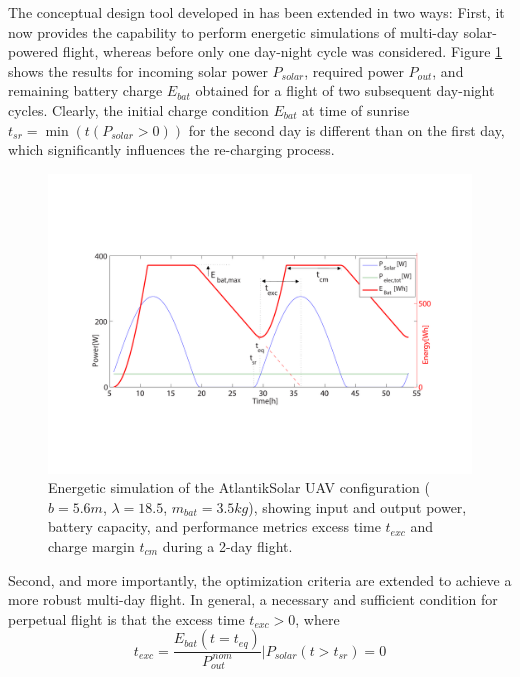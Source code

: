 \label{sec:ExtensionOptCriteria}
The conceptual design tool developed in \cite{Noth_PhD,Leutenegger_JIRS} has been extended in two ways: First, it now provides the capability to perform energetic simulations of multi-day solar-powered flight, whereas before only one day-night cycle was considered. Figure \ref{fig:EnergySimulation} shows the results for incoming solar power $P_{solar}$, required power $P_{out}$, and remaining battery charge $E_{bat}$ obtained for a flight of two subsequent day-night cycles. Clearly, the initial charge condition $E_{bat}$ at time of sunrise $t_{sr}=\min(t(P_{solar}>0))$ for the second day is different than on the first day, which significantly influences the re-charging process. 
\begin{figure}[tb]
    \centering
    \includegraphics[width=\linewidth]{images/2_EnergySimulation.pdf}
    \caption{Energetic simulation of the AtlantikSolar UAV configuration ($b=5.6m$, $\lambda=18.5$, $m_{bat}=3.5kg$), showing input and output power, battery capacity, and performance metrics excess time $t_{exc}$ and charge margin $t_{cm}$ during a 2-day flight.}
    \label{fig:EnergySimulation}
\end{figure}
Second, and more importantly, the optimization criteria are extended to achieve a more robust multi-day flight. In general, a necessary and sufficient condition for perpetual flight is that the excess time $t_{exc}>0$, where
\begin{equation} \label{eqn:t_exc}
t_{exc}=\frac{E_{bat}(t=t_{eq})}{P_{out}^{\,nom}} \Big| P_{solar}(t>t_{sr})=0
\end{equation}
